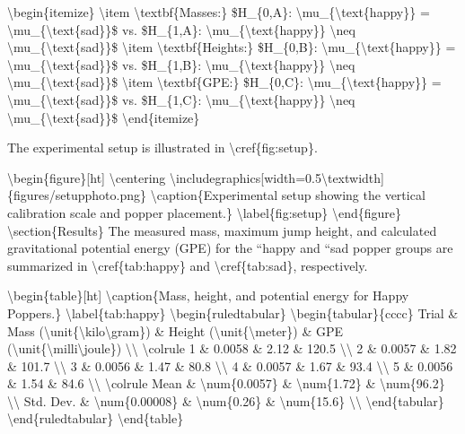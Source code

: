 \textbackslash begin\{itemize\} \textbackslash item
\textbackslash textbf\{Masses:\} \$H\_\{0,A\}:
\textbackslash mu\_\{\textbackslash text\{happy\}\} =
\textbackslash mu\_\{\textbackslash text\{sad\}\}\$ vs. \$H\_\{1,A\}:
\textbackslash mu\_\{\textbackslash text\{happy\}\} \textbackslash neq
\textbackslash mu\_\{\textbackslash text\{sad\}\}\$ \textbackslash item
\textbackslash textbf\{Heights:\} \$H\_\{0,B\}:
\textbackslash mu\_\{\textbackslash text\{happy\}\} =
\textbackslash mu\_\{\textbackslash text\{sad\}\}\$ vs. \$H\_\{1,B\}:
\textbackslash mu\_\{\textbackslash text\{happy\}\} \textbackslash neq
\textbackslash mu\_\{\textbackslash text\{sad\}\}\$ \textbackslash item
\textbackslash textbf\{GPE:\} \$H\_\{0,C\}:
\textbackslash mu\_\{\textbackslash text\{happy\}\} =
\textbackslash mu\_\{\textbackslash text\{sad\}\}\$ vs. \$H\_\{1,C\}:
\textbackslash mu\_\{\textbackslash text\{happy\}\} \textbackslash neq
\textbackslash mu\_\{\textbackslash text\{sad\}\}\$
\textbackslash end\{itemize\}

The experimental setup is illustrated in
\textbackslash cref\{fig:setup\}.

\textbackslash begin\{figure\}{[}ht{]} \textbackslash centering
\textbackslash includegraphics{[}width=0.5\textbackslash textwidth{]}\{figures/setupphoto.png\}
\textbackslash caption\{Experimental setup showing the vertical
calibration scale and popper placement.\}
\textbackslash label\{fig:setup\} \textbackslash end\{figure\}
\textbackslash section\{Results\} The measured mass, maximum jump
height, and calculated gravitational potential energy (GPE) for the
``happy\textquotesingle\textquotesingle{} and
``sad\textquotesingle\textquotesingle{} popper groups are summarized in
\textbackslash cref\{tab:happy\} and \textbackslash cref\{tab:sad\},
respectively.

\textbackslash begin\{table\}{[}ht{]} \textbackslash caption\{Mass,
height, and potential energy for Happy Poppers.\}
\textbackslash label\{tab:happy\} \textbackslash begin\{ruledtabular\}
\textbackslash begin\{tabular\}\{cccc\} Trial \& Mass
(\textbackslash unit\{\textbackslash kilo\textbackslash gram\}) \&
Height (\textbackslash unit\{\textbackslash meter\}) \& GPE
(\textbackslash unit\{\textbackslash milli\textbackslash joule\})
\textbackslash\textbackslash{} \textbackslash colrule 1 \& 0.0058 \&
2.12 \& 120.5 \textbackslash\textbackslash{} 2 \& 0.0057 \& 1.82 \&
101.7 \textbackslash\textbackslash{} 3 \& 0.0056 \& 1.47 \& 80.8
\textbackslash\textbackslash{} 4 \& 0.0057 \& 1.67 \& 93.4
\textbackslash\textbackslash{} 5 \& 0.0056 \& 1.54 \& 84.6
\textbackslash\textbackslash{} \textbackslash colrule Mean \&
\textbackslash num\{0.0057\} \& \textbackslash num\{1.72\} \&
\textbackslash num\{96.2\} \textbackslash\textbackslash{} Std. Dev. \&
\textbackslash num\{0.00008\} \& \textbackslash num\{0.26\} \&
\textbackslash num\{15.6\} \textbackslash\textbackslash{}
\textbackslash end\{tabular\} \textbackslash end\{ruledtabular\}
\textbackslash end\{table\}


